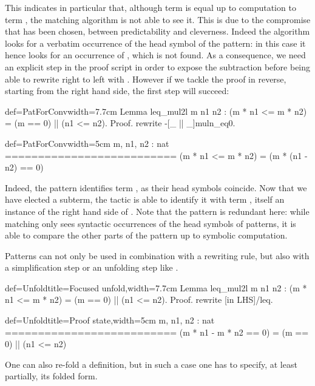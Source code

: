 This indicates in particular that, although term 
is equal up to computation to term , the matching
algorithm is not able to see it. This is due to the compromise that
has been chosen, between predictability and cleverness. Indeed the
algorithm looks for a verbatim occurrence of the head symbol of the
pattern: in this case it hence looks for an occurrence of \C{(_ - _)},
which is not found. As a consequence, we need an explicit step in the
proof script in order to expose the subtraction before being able to
rewrite right to left with . However if we tackle the proof
in reverse, starting from the right hand side, the first 
step will succeed:

\begin{coq}{def=PatForConv}{width=7.7cm}
Lemma leq_mul2l m n1 n2 :
(m * n1 <= m * n2) = (m == 0) || (n1 <= n2).
Proof.
rewrite -[_ || _]muln_eq0.
\end{coq}
\begin{coqout}{def=PatForConv}{width=5cm}
m, n1, n2 : nat
==========================
(m * n1 <= m * n2) =
  (m * (n1 - n2) == 0)
\end{coqout}

Indeed, the \C{[_ || _]} pattern identifies term , as
their head symbols coincide. Now that we have elected a subterm, the
 tactic is able to identify it with term
, itself an instance of the right hand side
of . Note that the \C{[_ || _]} pattern is redundant here:
while matching only sees syntactic occurrences of the
head symbols of patterns, it is able to compare the other parts of the
pattern up to symbolic computation.

Patterns can not only be used in combination with a rewriting rule,
but also with a simplification step \C{/=} or an unfolding step
like .

\begin{coq}{def=Unfold}{title=Focused unfold,width=7.7cm}
Lemma leq_mul2l m n1 n2 :
(m * n1 <= m * n2) = (m == 0) || (n1 <= n2).
Proof.
rewrite [in LHS]/leq.
\end{coq}
\begin{coqout}{def=Unfold}{title=Proof state,width=5cm}
m, n1, n2 : nat
==========================
(m * n1 - m * n2 == 0) =
  (m == 0) || (n1 <= n2)
\end{coqout}

One can also re-fold a definition, but in such a case one has to specify,
at least partially, its folded form.

